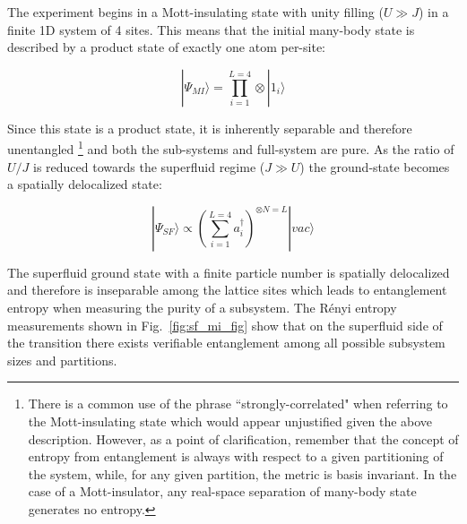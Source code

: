 The experiment begins in a Mott-insulating state with unity filling ($U \gg J$) in a finite 1D system of 4 sites. This means that the initial many-body state is described by a product state of exactly one atom per-site:

\[
|\Psi_{MI} \rangle = \prod_{i=1}^{L=4} \otimes | 1_i \rangle
\]

Since this state is a product state, it is inherently separable and therefore unentangled \footnote{There is a common use of the phrase ``strongly-correlated" when referring to the Mott-insulating state which would appear unjustified given the above description. However, as a point of clarification, remember that the concept of entropy from entanglement is always with respect to a given partitioning of the system, while, for any given partition, the metric is basis invariant. In the case of a Mott-insulator, any real-space separation of many-body state generates no entropy.} and both the sub-systems and full-system are pure. As the ratio of $U/J$ is reduced towards the superfluid regime ($J\gg U$) the ground-state becomes a spatially delocalized state:

\[
|\Psi_{SF} \rangle \propto \left ( \sum_{i=1}^{L=4} a^\dagger_i \right )^{\otimes N=L} |vac\rangle
\]

The superfluid ground state with a finite particle number is spatially delocalized and therefore is inseparable among the lattice sites which leads to entanglement entropy when measuring the purity of a subsystem. The R\'enyi entropy measurements shown in Fig.~\ref{fig:sf_mi_fig} show that on the superfluid side of the transition there exists verifiable entanglement among all possible subsystem sizes and partitions. 

